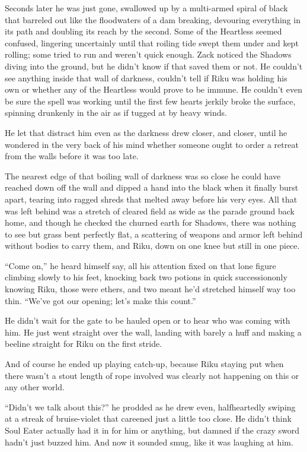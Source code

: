 Seconds later he was just gone, swallowed up by a multi-armed spiral of black that barreled out like the floodwaters of a dam breaking, devouring everything in its path and doubling its reach by the second. Some of the Heartless seemed confused, lingering uncertainly until that roiling tide swept them under and kept rolling; some tried to run and weren't quick enough. Zack noticed the Shadows diving into the ground, but he didn't know if that saved them or not. He couldn't see anything inside that wall of darkness, couldn't tell if Riku was holding his own or whether any of the Heartless would prove to be immune. He couldn't even be sure the spell was working until the first few hearts jerkily broke the surface, spinning drunkenly in the air as if tugged at by heavy winds.

He let that distract him even as the darkness drew closer, and closer, until he wondered in the very back of his mind whether someone ought to order a retreat from the walls before it was too late.

The nearest edge of that boiling wall of darkness was so close he could have reached down off the wall and dipped a hand into the black when it finally burst apart, tearing into ragged shreds that melted away before his very eyes. All that was left behind was a stretch of cleared field as wide as the parade ground back home, and though he checked the churned earth for Shadows, there was nothing to see but grass bent perfectly flat, a scattering of weapons and armor left behind without bodies to carry them, and Riku, down on one knee but still in one piece.

``Come on,'' he heard himself say, all his attention fixed on that lone figure climbing slowly to his feet, knocking back two potions in quick succession\textemdash only knowing Riku, those were ethers, and two meant he'd stretched himself way too thin. ``We've got our opening; let's make this count.''

He didn't wait for the gate to be hauled open or to hear who was coming with him. He just went straight over the wall, landing with barely a huff and making a beeline straight for Riku on the first stride.

And of course he ended up playing catch-up, because Riku staying put when there wasn't a stout length of rope involved was clearly not happening on this or any other world.

``Didn't we talk about this?'' he prodded as he drew even, halfheartedly swiping at a streak of bruise-violet that careened just a little too close. He didn't think Soul Eater actually had it in for him or anything, but damned if the crazy sword hadn't just buzzed him. And now it sounded smug, like it was laughing at him.

